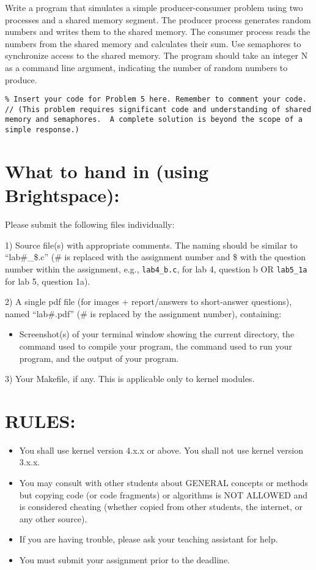 \documentclass{article}
\begin{document}
Write a program that simulates a simple producer-consumer problem using two processes and a shared memory segment. The producer process generates random numbers and writes them to the shared memory. The consumer process reads the numbers from the shared memory and calculates their sum.  Use semaphores to synchronize access to the shared memory.  The program should take an integer N as a command line argument, indicating the number of random numbers to produce.

\begin{verbatim}
% Insert your code for Problem 5 here. Remember to comment your code.
// (This problem requires significant code and understanding of shared memory and semaphores.  A complete solution is beyond the scope of a simple response.)
\end{verbatim}


\section*{What to hand in (using Brightspace):}

Please submit the following files individually:

1) Source file(s) with appropriate comments. The naming should be similar to “lab\#\_\$.c” (\# is replaced with the assignment number and \$ with the question number within the assignment, e.g., \texttt{lab4\_b.c}, for lab 4, question b OR \texttt{lab5\_1a} for lab 5, question 1a).

2) A single pdf file (for images + report/answers to short-answer questions), named “lab\#.pdf” (\# is replaced by the assignment number), containing:
    \begin{itemize}
        \item Screenshot(s) of your terminal window showing the current directory, the command used to compile your program, the command used to run your program, and the output of your program.
    \end{itemize}

3) Your Makefile, if any. This is applicable only to kernel modules.

\section*{RULES:}

\begin{itemize}
    \item You shall use kernel version 4.x.x or above. You shall not use kernel version 3.x.x.
    \item You may consult with other students about GENERAL concepts or methods but copying code (or code fragments) or algorithms is NOT ALLOWED and is considered cheating (whether copied from other students, the internet, or any other source).
    \item If you are having trouble, please ask your teaching assistant for help.
    \item You must submit your assignment prior to the deadline.
\end{itemize}
\end{document}
